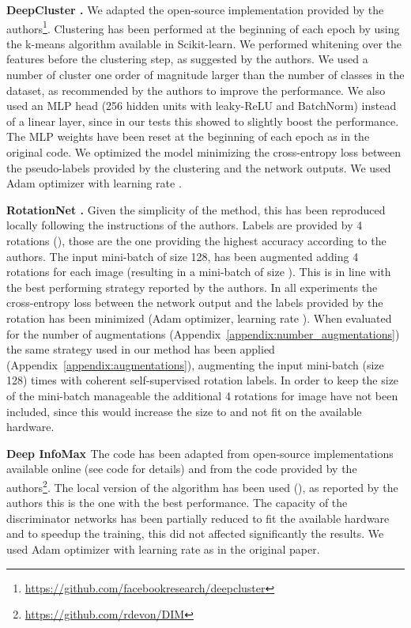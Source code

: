 \documentclass{article}
\begin{document}
\textbf{DeepCluster \citep{caron2018deep}.}  We adapted the open-source implementation provided by the authors\footnote{\url{https://github.com/facebookresearch/deepcluster}}. Clustering has been performed at the beginning of each epoch by using the k-means algorithm available in Scikit-learn. We performed whitening over the features before the clustering step, as suggested by the authors. We used a number of cluster one order of magnitude larger than the number of classes in the dataset, as recommended by the authors to improve the performance. We also used an MLP head (256 hidden units with leaky-ReLU and BatchNorm) instead of a linear layer, since in our tests this showed to slightly boost the performance. The MLP weights have been reset at the beginning of each epoch as in the original code. We optimized the model minimizing the cross-entropy loss between the pseudo-labels provided by the clustering and the network outputs. We used Adam optimizer with learning rate .

\textbf{RotationNet \citep{gidaris2018unsupervised}.} Given the simplicity of the method, this has been reproduced locally following the instructions of the authors. Labels are provided by 4 rotations (), those are the one providing the highest accuracy according to the authors. The input mini-batch of size 128, has been augmented adding 4 rotations for each image (resulting in a mini-batch of size ). This is in line with the best performing strategy reported by the authors. In all experiments the cross-entropy loss between the network output and the labels provided by the rotation has been minimized (Adam optimizer, learning rate ). When evaluated for the number of augmentations (Appendix~\ref{appendix:number_augmentations}) the same strategy used in our method has been applied (Appendix~\ref{appendix:augmentations}), augmenting the input mini-batch (size 128)  times with coherent self-supervised rotation labels. In order to keep the size of the mini-batch manageable the additional 4 rotations for image have not been included, since this would increase the size to  and not fit on the available hardware.

\textbf{Deep InfoMax \citep{hjelm2018learning}} The code has been adapted from open-source implementations available online (see code for details) and from the code provided by the authors\footnote{\url{https://github.com/rdevon/DIM}}. The local version of the algorithm has been used (), as reported by the authors this is the one with the best performance. The capacity of the discriminator networks has been partially reduced to fit the available hardware and to speedup the training, this did not affected significantly the results. We used Adam optimizer with learning rate  as in the original paper.
\end{document}
